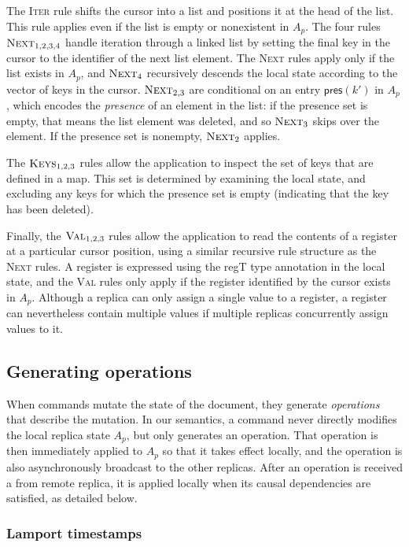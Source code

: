 \documentclass[10pt,journal,compsoc]{IEEEtran}
\begin{document}
The \textsc{Iter} rule shifts the cursor into a list and positions it at the \textsf{head} of the list. This rule applies even if the list is empty or nonexistent in $A_p$. The four rules $\textsc{Next}_{1,2,3,4}$ handle iteration through a linked list by setting the final key in the cursor to the identifier of the next list element. The \textsc{Next} rules apply only if the list exists in $A_p$, and $\textsc{Next}_4$ recursively descends the local state according to the vector of keys in the cursor. $\textsc{Next}_{2,3}$ are conditional on an entry $\mathsf{pres}(k')$ in $A_p$, which encodes the \emph{presence} of an element in the list: if the presence set is empty, that means the list element was deleted, and so $\textsc{Next}_3$ skips over the element. If the presence set is nonempty, $\textsc{Next}_2$ applies.

The $\textsc{Keys}_{1,2,3}$ rules allow the application to inspect the set of keys that are defined in a map. This set is determined by examining the local state, and excluding any keys for which the presence set is empty (indicating that the key has been deleted).

Finally, the $\textsc{Val}_{1,2,3}$ rules allow the application to read the contents of a register at a particular cursor position, using a similar recursive rule structure as the \textsc{Next} rules. A register is expressed using the \textsf{regT} type annotation in the local state, and the \textsc{Val} rules only apply if the register identified by the cursor exists in $A_p$. Although a replica can only assign a single value to a register, a register can nevertheless contain multiple values if multiple replicas concurrently assign values to it.

\subsection{Generating operations}

When commands mutate the state of the document, they generate \emph{operations} that describe the mutation. In our semantics, a command never directly modifies the local replica state $A_p$, but only generates an operation. That operation is then immediately applied to $A_p$ so that it takes effect locally, and the operation is also asynchronously broadcast to the other replicas. After an operation is received a from remote replica, it is applied locally when its causal dependencies are satisfied, as detailed below.

\subsubsection{Lamport timestamps}
\end{document}
